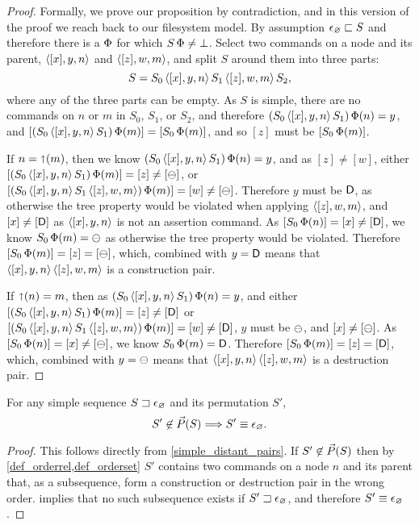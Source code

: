 \begin{proof}
Formally, we prove our proposition by contradiction,
and in this version of the proof we reach back to our filesystem model.
By assumption $\epsilon_\varnothing\sqsubset{S}$ and therefore there is a $\Phi$ for which $S\,\Phi\neq\bot$.
Select two commands on a node and its parent, $\langle{[x],y,n}\rangle$ and $\langle{[z],w,m}\rangle$,
and split $S$ around them into three parts:
\[ S = S_0 \, \langle{[x],y,n}\rangle \, S_1 \, \langle{[z],w,m}\rangle \, S_2, \]
where any of the three parts can be empty.
As $S$ is simple, there are no commands on $n$ or $m$ in $S_0$, $S_1$, or $S_2$,
and therefore $(S_0\,\langle{[x],y,n}\rangle\, S_1)\,\Phi(n) = y$,
and $[(S_0\,\langle{[x],y,n}\rangle\, S_1)\,\Phi(m)] = [S_0\,\Phi(m)]$,
and so $[z]$ must be $[S_0\,\Phi(m)]$.

If $n=\mathord{\shortuparrow}(m)$, then 
we know $(S_0\,\langle{[x],y,n}\rangle\, S_1)\,\Phi(n) = y$, and as $[z]\neq[w]$, either
$[(S_0\,\langle{[x],y,n}\rangle\, S_1)\allowbreak\,\Phi(m)]=[z]\neq[\ominus]$,
or $[(S_0\,\langle{[x],y,n}\rangle\, S_1\,\langle{[z],w,m}\rangle)\allowbreak\,\Phi(m)]=[w]\neq[\ominus]$.
Therefore $y$ must be $\mathsf{D}$, as otherwise the tree property would be violated
when applying $\langle{[z],w,m}\rangle$,
and $[x]\neq[\mathsf{D}]$ as $\langle{[x],y,n}\rangle$ is not an assertion command.
As $[S_0\,\Phi(n)]=[x]\neq[\mathsf{D}]$, we know
$S_0\,\Phi(m)=\ominus$ as otherwise the tree property would be violated.
Therefore $[S_0\,\Phi(m)]=[z]=[\ominus]$, which, combined with $y=\mathsf{D}$
means that $\langle{[x],y,n}\rangle\,\langle{[z],w,m}\rangle$ is a construction pair.

If $\mathord{\shortuparrow}(n)=m$, then 
as $(S_0\,\langle{[x],y,n}\rangle\, S_1)\,\Phi(n) = y$, and either
$[(S_0\,\langle{[x],y,n}\rangle\, S_1)\allowbreak\,\Phi(m)]=[z]\neq[\mathsf{D}]$
or $[(S_0\,\langle{[x],y,n}\rangle\, S_1\,\langle{[z],w,m}\rangle)\allowbreak\,\Phi(m)]=[w]\neq[\mathsf{D}]$,
$y$ must be $\ominus$, and $[x]\neq[\ominus]$.
As $[S_0\,\Phi(n)]=[x]\neq[\ominus]$, we know $S_0\,\Phi(m)=\mathsf{D}$.
Therefore $[S_0\,\Phi(m)]=[z]=[\mathsf{D}]$, which, combined with $y=\ominus$
means that $\langle{[x],y,n}\rangle\,\langle{[z],w,m}\rangle$ is a destruction pair.
\end{proof}


\begin{mycor}
For any simple sequence ${S}\sqsupset\epsilon_\varnothing$ and its permutation $S'$, 
\[ S'\not\in\vec{P}({S}) \Longrightarrow S'\equiv\epsilon_\varnothing. \]
\end{mycor}
\begin{proof}
This follows directly from \cref{simple_distant_pairs}.
If $S'\not\in\vec{P}({S})$ then by \cref{def_orderrel,def_orderset}
$S'$ contains two commands on a node $n$ and its parent
that, as a subsequence,
form a construction or destruction pair in the wrong order.
 implies that no such subsequence exists
if ${S'}\sqsupset\epsilon_\varnothing$, and therefore $S'\equiv\epsilon_\varnothing$.
\end{proof}



